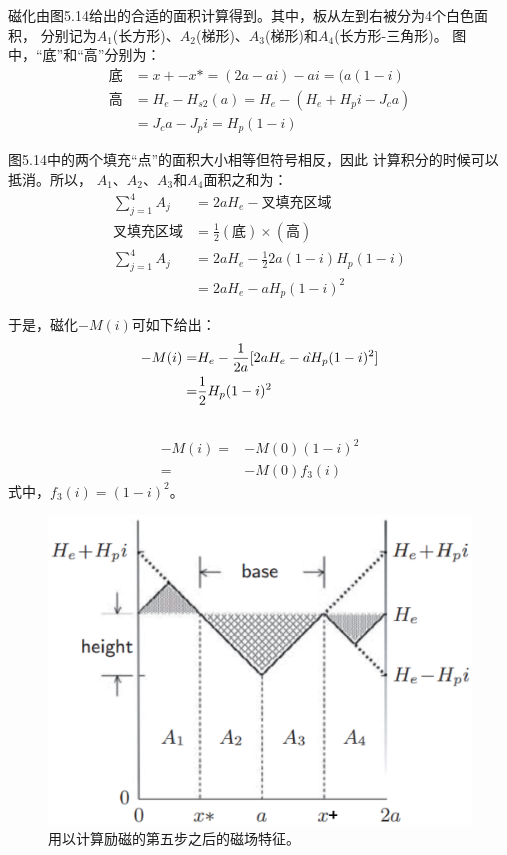 磁化由图5.14给出的合适的面积计算得到。其中，板从左到右被分为4个白色面积，
分别记为$A_1$(长方形)、$A_2$(梯形)、$A_3$(梯形)和$A_4$(长方形-三角形)。
图中，“底”和“高”分别为：
\begin{align*}
\mbox{底}&=x+-x*=(2a-ai)-ai=(a(1-i)\\
\mbox{高}&=H_{e}-H_{s2}(a)=H_{e}-(H_{e}+H_{p}i-J_{c}a)\\
&=J_{c}a-J_{p}i=H_{p}(1-i)
\end{align*}

图5.14中的两个填充“点”的面积大小相等但符号相反，因此
计算积分的时候可以抵消。所以，
$A_1$、$A_2$、$A_3$和$A_4$面积之和为：
\begin{align*}
\sum_{j=1}^{4}A_{j}&=2aH_{e}-\mbox{叉填充区域}\\
\mbox{叉填充区域}&=\frac{1}{2}(\mbox{底})\times(\mbox{高})\\
\sum_{j=1}^{4}A_{j}&=2aH_{e}-\frac{1}{2}2a(1-i)H_{p}(1-i)\\
&=2aH_{e}-aH_{p}(1-i)^{2}
\end{align*}

于是，磁化$−M(i)$可如下给出：
\begin{align*}%
-M(i)=&H_{e}-\frac{1}{2a}[2aH_{e}-a \grave{}H_{p}(1-i)^{2}]\\
=&\frac{1}{2}H_{p}(1-i)^{2}\\\notag
\end{align*}
\begin{subequations}
	\begin{align}%
	-M(i)=&-M(0)(1-i)^{2}\\
	=&-M(0)f_{3}(i)
	\end{align}
\end{subequations}
式中，$f_3(i) = (1 − i)^2$。

\begin{figure}[htbp]
	\centering
	\includegraphics[scale=0.5]{chpt5/figs/fig5.14.eps}
	\caption{用以计算励磁的第五步之后的磁场特征。}
\end{figure}


